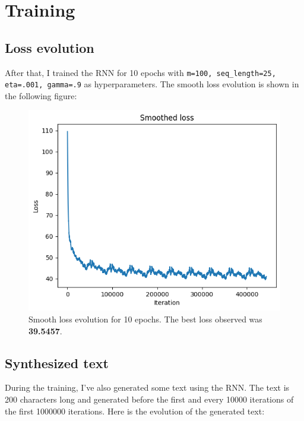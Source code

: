 \documentclass{article}
\begin{document}
\section*{Training}

\subsection*{Loss evolution}

After that, I trained the RNN for 10 epochs with \texttt{m=100, seq\_length=25, eta=.001, gamma=.9} as hyperparameters. The smooth loss evolution is shown in the following figure:

\begin{figure}[H]
    \centering
    \includegraphics[width=\linewidth]{Result_Pics/loss.png}
    \caption{Smooth loss evolution for 10 epochs. The best loss observed was \textbf{39.5457}.}
\end{figure}

\subsection*{Synthesized text}

During the training, I've also generated some text using the RNN. The text is 200 characters long and generated before the first and every 10000 iterations of the first 1000000 iterations. Here is the evolution of the generated text:
\end{document}
